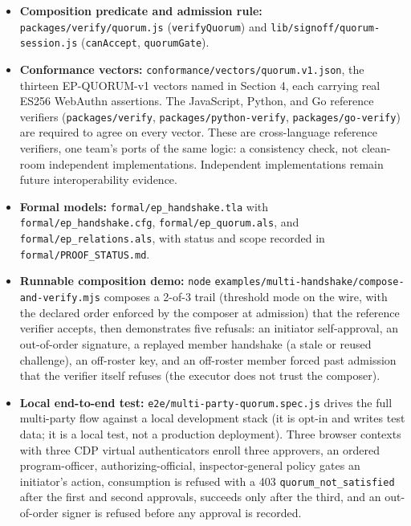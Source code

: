 \documentclass[
  11pt,
]{article}
\providecommand{\tightlist}{%
  \setlength{\itemsep}{0pt}\setlength{\parskip}{0pt}}
\begin{document}
\begin{itemize}
\tightlist
\item
  \textbf{Composition predicate and admission rule:}
  \texttt{packages/verify/quorum.js} (\texttt{verifyQuorum}) and
  \texttt{lib/signoff/quorum-session.js} (\texttt{canAccept},
  \texttt{quorumGate}).
\item
  \textbf{Conformance vectors:}
  \texttt{conformance/vectors/quorum.v1.json}, the thirteen EP-QUORUM-v1
  vectors named in Section 4, each carrying real ES256 WebAuthn
  assertions. The JavaScript, Python, and Go reference verifiers
  (\texttt{packages/verify}, \texttt{packages/python-verify},
  \texttt{packages/go-verify}) are required to agree on every vector.
  These are cross-language reference verifiers, one team's ports of the
  same logic: a consistency check, not clean-room independent
  implementations. Independent implementations remain future
  interoperability evidence.
\item
  \textbf{Formal models:} \texttt{formal/\allowbreak ep\_handshake.tla}
  with \texttt{formal/\allowbreak ep\_handshake.cfg},
  \texttt{formal/\allowbreak ep\_quorum.als}, and
  \texttt{formal/\allowbreak ep\_relations.als}, with status and scope
  recorded in \texttt{formal/\allowbreak PROOF\_STATUS.md}.
\item
  \textbf{Runnable composition demo:} \texttt{node}
  \texttt{examples/multi-\allowbreak handshake/compose-\allowbreak and-verify.mjs}
  composes a 2-of-3 trail (threshold mode on the wire, with the declared
  order enforced by the composer at admission) that the reference
  verifier accepts, then demonstrates five refusals: an initiator
  self-approval, an out-of-order signature, a replayed member handshake
  (a stale or reused challenge), an off-roster key, and an off-roster
  member forced past admission that the verifier itself refuses (the
  executor does not trust the composer).
\item
  \textbf{Local end-to-end test:}
  \texttt{e2e/multi-party-quorum.spec.js} drives the full multi-party
  flow against a local development stack (it is opt-in and writes test
  data; it is a local test, not a production deployment). Three browser
  contexts with three CDP virtual authenticators enroll three approvers,
  an ordered program-officer, authorizing-official, inspector-general
  policy gates an initiator's action, consumption is refused with a 403
  \texttt{quorum\_not\_satisfied} after the first and second approvals,
  succeeds only after the third, and an out-of-order signer is refused
  before any approval is recorded.
\end{itemize}
\end{document}
